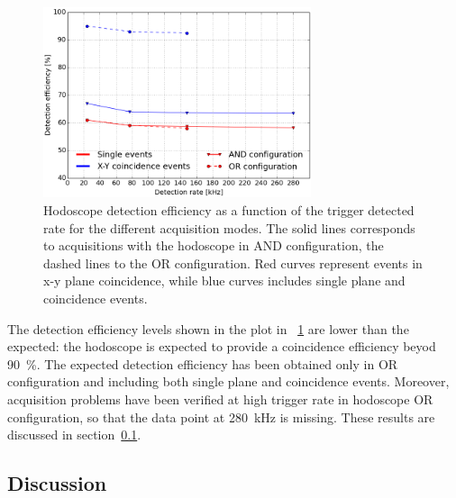 \begin{figure}[!htbp]
\centering
\includegraphics[width=0.7\textwidth]{03_GraphicFiles/chapter6_BeamTests/Nice_May2018/MAY_Eff_intensity.png}
\caption{Hodoscope detection efficiency as a function of the trigger detected rate for the different acquisition modes. The solid lines corresponds to acquisitions with the hodoscope in AND configuration, the dashed lines to the OR configuration. Red curves represent events in x-y plane coincidence, while blue curves includes single plane and coincidence events.}
\label{chap6::fig::May_HodoEffInt}
\end{figure}

The detection efficiency levels shown in the plot in \figurename~\ref{chap6::fig::May_HodoEffInt} are lower than the expected: the hodoscope is expected to provide a coincidence efficiency beyod 90~\%. The expected detection efficiency has been obtained only in OR configuration and including both single plane and coincidence events. Moreover, acquisition problems have been verified at high trigger rate in hodoscope OR configuration, so that the data point at 280~kHz is missing. These results are discussed in section~\ref{chap6::subsec::mayDiscussion}. 

\subsection{Discussion}\label{chap6::subsec::mayDiscussion} 

